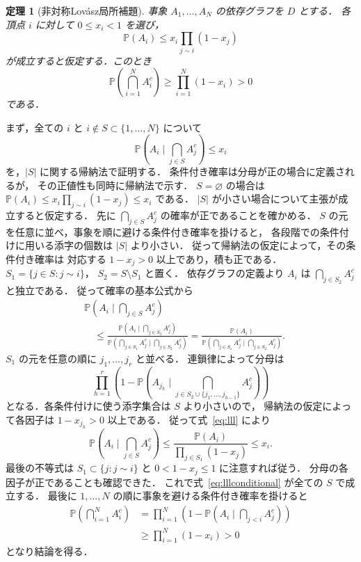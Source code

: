 \documentclass[a5paper,10pt,onecolumn]{jsarticle}
\makeatletter
\theoremstyle{mathnotetheorem}
\newtheorem{theorem}{定理}[section]
\renewcommand{\proofname}{証明}
\renewenvironment{proof}[1][\proofname]{%
  \par\pushQED{\qed}\normalfont\topsep4\p@\@plus2\p@\relax
  \trivlist\item[\hskip\labelsep\bfseries #1]\ignorespaces
}{\popQED\endtrivlist\@endpefalse}
\makeatother
\begin{document}
\begin{theorem}[非対称Lov\'asz局所補題]\label{thm:lll}
事象 $A_1,\ldots,A_N$ の依存グラフを $D$ とする．
各頂点 $i$ に対して $0\le x_i<1$ を選び，
\begin{equation}\label{eq:lll}
 \mathbb P(A_i)\le x_i\prod_{j\sim i}(1-x_j)
\end{equation}
が成立すると仮定する．このとき
\[
 \mathbb P\left(\bigcap_{i=1}^N A_i^c\right)
 \ge\prod_{i=1}^N(1-x_i)>0
\]
である．
\end{theorem}
\begin{proof}
まず，全ての $i$ と $i\notin S\subset\{1,\ldots,N\}$ について
\begin{equation}\label{eq:lllconditional}
 \mathbb P\left(A_i\mid\bigcap_{j\in S}A_j^c\right)\le x_i
\end{equation}
を，$|S|$ に関する帰納法で証明する．
条件付き確率は分母が正の場合に定義されるが，
その正値性も同時に帰納法で示す．
$S=\varnothing$ の場合は
$\mathbb P(A_i)\le x_i\prod_{j\sim i}(1-x_j)\le x_i$ である．
$|S|$ が小さい場合について主張が成立すると仮定する．
先に $\bigcap_{j\in S}A_j^c$ の確率が正であることを確かめる．
$S$ の元を任意に並べ，事象を順に避ける条件付き確率を掛けると，
各段階での条件付けに用いる添字の個数は $|S|$ より小さい．
従って帰納法の仮定によって，その条件付き確率は
対応する $1-x_j>0$ 以上であり，積も正である．
$S_1=\{j\in S:j\sim i\}$，
$S_2=S\setminus S_1$ と置く．
依存グラフの定義より $A_i$ は
$\bigcap_{j\in S_2}A_j^c$ と独立である．
従って確率の基本公式から
\[
 \begin{aligned}
 &\mathbb P\left(A_i\mid\bigcap_{j\in S}A_j^c\right)\\
 &\quad\le
 \frac{\mathbb P(A_i\mid\bigcap_{j\in S_2}A_j^c)}
 {\mathbb P(\bigcap_{j\in S_1}A_j^c\mid
 \bigcap_{j\in S_2}A_j^c)}
 =\frac{\mathbb P(A_i)}
 {\mathbb P(\bigcap_{j\in S_1}A_j^c\mid
 \bigcap_{j\in S_2}A_j^c)}.
 \end{aligned}
\]
$S_1$ の元を任意の順に $j_1,\ldots,j_r$ と並べる．
連鎖律によって分母は
\[
 \prod_{h=1}^r
 \left(1-\mathbb P\left(A_{j_h}\mid
 \bigcap_{j\in S_2\cup\{j_1,\ldots,j_{h-1}\}}A_j^c\right)\right)
\]
となる．各条件付けに使う添字集合は $S$ より小さいので，
帰納法の仮定によって各因子は
$1-x_{j_h}>0$ 以上である．
従って式~\eqref{eq:lll} により
\[
 \mathbb P\left(A_i\mid\bigcap_{j\in S}A_j^c\right)
 \le\frac{\mathbb P(A_i)}{\prod_{j\in S_1}(1-x_j)}
 \le x_i.
\]
最後の不等式は $S_1\subset\{j:j\sim i\}$ と
$0<1-x_j\le1$ に注意すれば従う．
分母の各因子が正であることも確認できた．
これで式~\eqref{eq:lllconditional} が全ての $S$ で成立する．
最後に $1,\ldots,N$ の順に事象を避ける条件付き確率を掛けると
\[
 \begin{aligned}
 \mathbb P\left(\bigcap_{i=1}^N A_i^c\right)
 &=\prod_{i=1}^N
 \left(1-\mathbb P\left(A_i\mid
 \bigcap_{j<i}A_j^c\right)\right)\\
 &\ge\prod_{i=1}^N(1-x_i)>0
 \end{aligned}
\]
となり結論を得る．
\end{proof}
\end{document}

